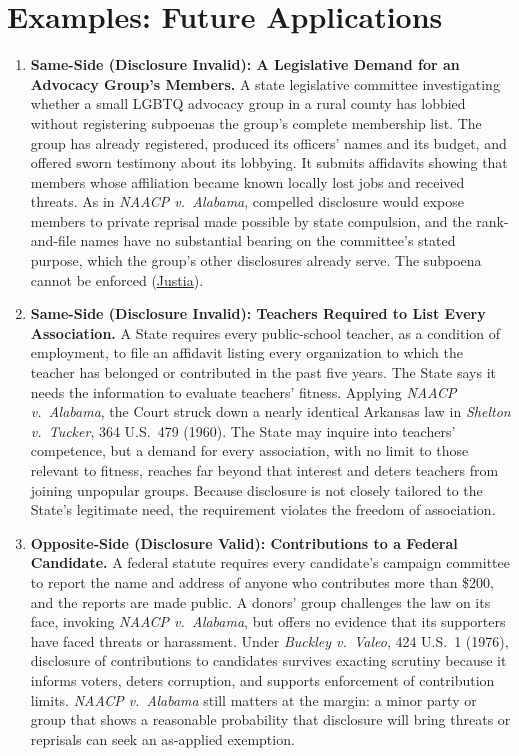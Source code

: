 \documentclass[12pt]{article}
\begin{document}
\section{Examples: Future Applications}
\begin{enumerate}

\item \textbf{Same-Side (Disclosure Invalid): A Legislative Demand for an Advocacy Group's Members.} A state legislative committee investigating whether a small LGBTQ advocacy group in a rural county has lobbied without registering subpoenas the group's complete membership list. The group has already registered, produced its officers' names and its budget, and offered sworn testimony about its lobbying. It submits affidavits showing that members whose affiliation became known locally lost jobs and received threats. As in \textit{NAACP v.\ Alabama}, compelled disclosure would expose members to private reprisal made possible by state compulsion, and the rank-and-file names have no substantial bearing on the committee's stated purpose, which the group's other disclosures already serve. The subpoena cannot be enforced (\href{https://supreme.justia.com/cases/federal/us/357/449/}{Justia}).

\item \textbf{Same-Side (Disclosure Invalid): Teachers Required to List Every Association.} A State requires every public-school teacher, as a condition of employment, to file an affidavit listing every organization to which the teacher has belonged or contributed in the past five years. The State says it needs the information to evaluate teachers' fitness. Applying \textit{NAACP v.\ Alabama}, the Court struck down a nearly identical Arkansas law in \textit{Shelton v.\ Tucker}, 364 U.S.\ 479 (1960). The State may inquire into teachers' competence, but a demand for every association, with no limit to those relevant to fitness, reaches far beyond that interest and deters teachers from joining unpopular groups. Because disclosure is not closely tailored to the State's legitimate need, the requirement violates the freedom of association.

\item \textbf{Opposite-Side (Disclosure Valid): Contributions to a Federal Candidate.} A federal statute requires every candidate's campaign committee to report the name and address of anyone who contributes more than \$200, and the reports are made public. A donors' group challenges the law on its face, invoking \textit{NAACP v.\ Alabama}, but offers no evidence that its supporters have faced threats or harassment. Under \textit{Buckley v.\ Valeo}, 424 U.S.\ 1 (1976), disclosure of contributions to candidates survives exacting scrutiny because it informs voters, deters corruption, and supports enforcement of contribution limits. \textit{NAACP v.\ Alabama} still matters at the margin: a minor party or group that shows a reasonable probability that disclosure will bring threats or reprisals can seek an as-applied exemption.


\end{enumerate}
\end{document}
